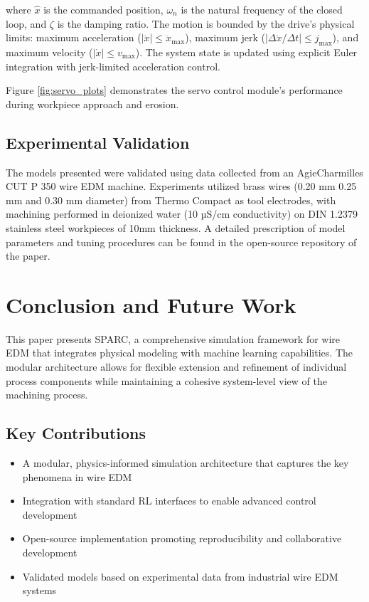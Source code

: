 \documentclass[5p,times,procedia]{elsarticle}
\begin{document}
where $\hat{x}$ is the commanded position, $\omega_n$ is the natural frequency of the closed loop, and $\zeta$ is the damping ratio. The motion is bounded by the drive's physical limits: maximum acceleration ($|\ddot{x}| \leq \ddot{x}_{\text{max}}$), maximum jerk ($|\Delta \ddot{x}/\Delta t| \leq j_{\text{max}}$), and maximum velocity ($|\dot{x}| \leq v_{\text{max}}$). The system state is updated using explicit Euler integration with jerk-limited acceleration control.

Figure \ref{fig:servo_plots} demonstrates the servo control module's performance during workpiece approach and erosion.

\subsection{Experimental Validation}

The models presented were validated using data collected from an AgieCharmilles CUT P 350 wire EDM machine. Experiments utilized brass wires (0.20 mm 0.25 mm and 0.30 mm diameter) from Thermo Compact as tool electrodes, with machining performed in deionized water (10 µS/cm conductivity) on DIN 1.2379 stainless steel workpieces of 10mm thickness. A detailed prescription of model parameters and tuning procedures can be found in the open-source repository of the paper.

\section{Conclusion and Future Work}

This paper presents SPARC, a comprehensive simulation framework for wire EDM that integrates physical modeling with machine learning capabilities. The modular architecture allows for flexible extension and refinement of individual process components while maintaining a cohesive system-level view of the machining process.

\subsection{Key Contributions}

\begin{itemize}
    \item A modular, physics-informed simulation architecture that captures the key phenomena in wire EDM
    \item Integration with standard RL interfaces to enable advanced control development
    \item Open-source implementation promoting reproducibility and collaborative development
    \item Validated models based on experimental data from industrial wire EDM systems
\end{itemize}
\end{document}
